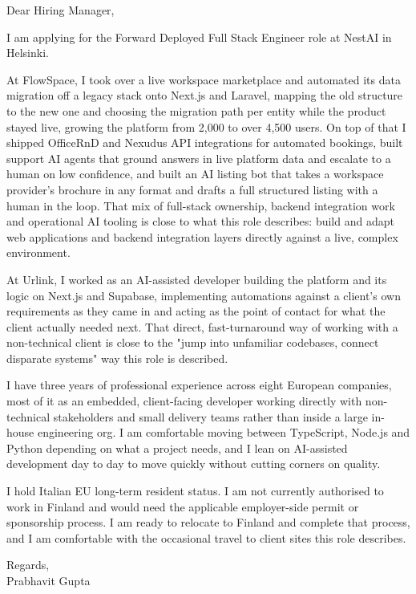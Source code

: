\documentclass[a4paper,11pt]{article}
\begin{document}
Dear Hiring Manager,

I am applying for the Forward Deployed Full Stack Engineer role at NestAI in Helsinki.

At FlowSpace, I took over a live workspace marketplace and automated its data migration off a legacy stack onto Next.js and Laravel, mapping the old structure to the new one and choosing the migration path per entity while the product stayed live, growing the platform from 2,000 to over 4,500 users. On top of that I shipped OfficeRnD and Nexudus API integrations for automated bookings, built support AI agents that ground answers in live platform data and escalate to a human on low confidence, and built an AI listing bot that takes a workspace provider's brochure in any format and drafts a full structured listing with a human in the loop. That mix of full-stack ownership, backend integration work and operational AI tooling is close to what this role describes: build and adapt web applications and backend integration layers directly against a live, complex environment.

At Urlink, I worked as an AI-assisted developer building the platform and its logic on Next.js and Supabase, implementing automations against a client's own requirements as they came in and acting as the point of contact for what the client actually needed next. That direct, fast-turnaround way of working with a non-technical client is close to the "jump into unfamiliar codebases, connect disparate systems" way this role is described.

I have three years of professional experience across eight European companies, most of it as an embedded, client-facing developer working directly with non-technical stakeholders and small delivery teams rather than inside a large in-house engineering org. I am comfortable moving between TypeScript, Node.js and Python depending on what a project needs, and I lean on AI-assisted development day to day to move quickly without cutting corners on quality.

I hold Italian EU long-term resident status. I am not currently authorised to work in Finland and would need the applicable employer-side permit or sponsorship process. I am ready to relocate to Finland and complete that process, and I am comfortable with the occasional travel to client sites this role describes.

Regards,\\
Prabhavit Gupta
\end{document}
